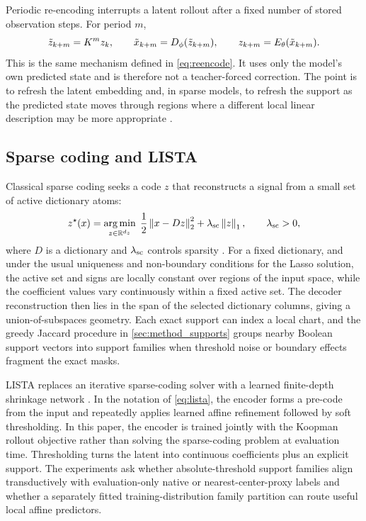 Periodic re-encoding interrupts a latent rollout after a fixed number of stored observation steps. For period \(m\),
\begin{equation}
  \tilde z_{k+m}=K^m z_k,\qquad
  \tilde x_{k+m}=D_\phi(\tilde z_{k+m}),\qquad
  z_{k+m}=E_\theta(\tilde x_{k+m}).
\end{equation}
This is the same mechanism defined in \cref{eq:reencode}. It uses only the model's own predicted state and is therefore not a teacher-forced correction. The point is to refresh the latent embedding and, in sparse models, to refresh the support as the predicted state moves through regions where a different local linear description may be more appropriate \citep{fathi2024course}.

\subsection{Sparse coding and LISTA}
\label{app:sparse_lista_background}

Classical sparse coding seeks a code \(z\) that reconstructs a signal from a small set of active dictionary atoms:
\begin{equation}
  z^\star(x)=
  \operatorname*{arg\,min}_{z\in\mathbb{R}^{d_z}}\;\frac{1}{2}\left\lVert x-Dz \right\rVert_2^2+\lambda_{\rm sc}\left\lVert z \right\rVert_1,
  \qquad \lambda_{\rm sc}>0,
\end{equation}
where \(D\) is a dictionary and \(\lambda_{\rm sc}\) controls sparsity \citep{olshausen_emergence_1996,chen_atomic_1998,donoho_optimally_2003}. For a fixed dictionary, and under the usual uniqueness and non-boundary conditions for the Lasso solution, the active set and signs are locally constant over regions of the input space, while the coefficient values vary continuously within a fixed active set. The decoder reconstruction then lies in the span of the selected dictionary columns, giving a union-of-subspaces geometry. Each exact support can index a local chart, and the greedy Jaccard procedure in \cref{sec:method_supports} groups nearby Boolean support vectors into support families when threshold noise or boundary effects fragment the exact masks.

LISTA replaces an iterative sparse-coding solver with a learned finite-depth shrinkage network \citep{gregor_learning_2010}. In the notation of \cref{eq:lista}, the encoder forms a pre-code from the input and repeatedly applies learned affine refinement followed by soft thresholding. In this paper, the encoder is trained jointly with the Koopman rollout objective rather than solving the sparse-coding problem at evaluation time. Thresholding turns the latent into continuous coefficients plus an explicit support. The experiments ask whether absolute-threshold support families align transductively with evaluation-only native or nearest-center-proxy labels and whether a separately fitted training-distribution family partition can route useful local affine predictors.
